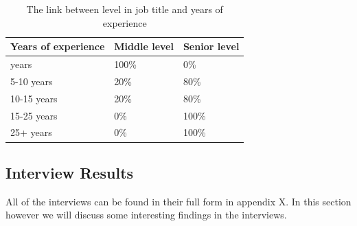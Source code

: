\documentclass{article}
\begin{document}
\begin{table}[H]
\centering
\begin{tabular}{|l|l|l|}
\hline
\textbf{Years of experience} & \textbf{Middle level} & \textbf{Senior level} \\ \hline
\< 5 years           & 100\%         & 0\%           \\ \hline
5-10 years        & 20\%          & 80\%          \\ \hline
10-15 years       & 20\%          & 80\%          \\ \hline
15-25 years       & 0\%           & 100\%         \\ \hline
25+ years           & 0\%           & 100\%         \\ \hline
\end{tabular}
\caption{The link between level in job title and years of experience}
\label{tab:experience_level}
\end{table}

\subsection{Interview Results}

All of the interviews can be found in their full form in appendix X. In this section however
we will discuss some interesting findings in the interviews.
\end{document}

